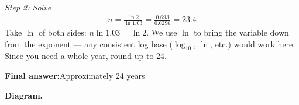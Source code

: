 \documentclass[11pt]{article}
\begin{document}
\textit{Step 2: Solve}
\[\begin{gathered}
n = \frac{\ln 2}{\ln 1.03} = \frac{0.693}{0.0296} = 23.4
\end{gathered}\]
Take \( \ln \) of both sides: \( n\ln 1.03 = \ln 2 \). We use \( \ln \) to bring the variable down from the exponent --- any consistent log base (\( \log_{10} \), \( \ln \), etc.) would work here. Since you need a whole year, round up to 24.

\begin{answerbox}
\textbf{Final answer:}\quad Approximately 24 years
\end{answerbox}
\textbf{Diagram.}

\begin{center}
\end{center}
\end{document}
